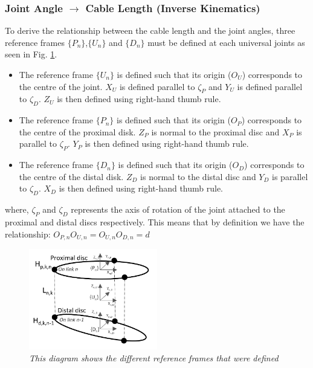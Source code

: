 \documentclass[a4paper,12pt]{report}
\begin{document}
\subsubsection{Joint Angle \textbf{$\longrightarrow$} Cable Length (Inverse Kinematics)}
To derive the relationship between the cable length and the joint angles, three reference frames $\{P_n\}$,$\{U_n\}$ and $\{D_n\}$ must be defined at each universal joints as seen in Fig. \ref{ref-frames}.

\begin{itemize}
	\item The reference frame $\{U_n\}$ is defined such that its origin ($O_U$) corresponds to the centre of the joint. $X_U$ is defined parallel to $\zeta_P$ and $Y_U$ is defined parallel to $\zeta_D$. $Z_U$ is then defined using right-hand thumb rule.
	\item The reference frame $\{P_n\}$ is defined such that its origin ($O_P$) corresponds to the centre of the proximal disk. $Z_P$ is normal to the proximal disc and $X_P$ is parallel to $\zeta_P$. $Y_P$ is then defined using right-hand thumb rule.
	\item The reference frame $\{D_n\}$ is defined such that its origin ($O_D$) corresponds to the centre of the distal disk. $Z_D$ is normal to the distal disc and $Y_D$ is parallel to $\zeta_D$. $X_D$ is then defined using right-hand thumb rule.
\end{itemize}

where, $\zeta_P$ and $\zeta_D$ represents the axis of rotation of the joint attached to the proximal and distal discs respectively.
This means that by definition we have the relationship: $O_{P,n}O_{U,n}=O_{U,n}O_{D,n}=d$
\begin{figure}[H]
	\centering
	\includegraphics[width=0.5\textwidth]{images/Refrence_frames.png}
	\caption{\textit{This diagram shows the different reference frames that were defined}}
	\label{ref-frames}
\end{figure}
\end{document}
